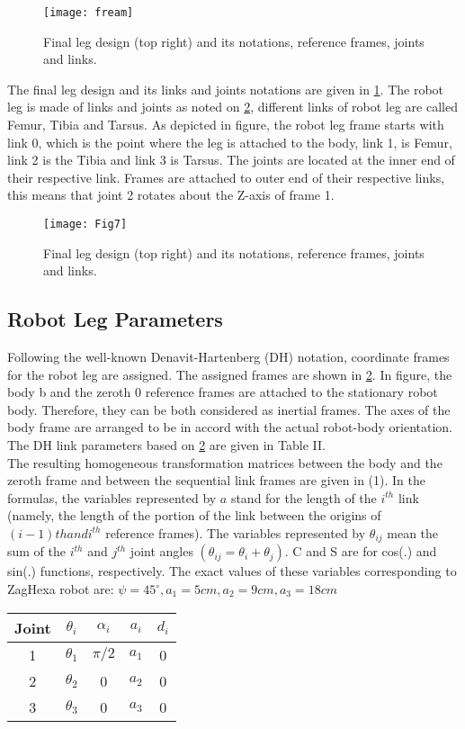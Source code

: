 \begin{figure}[h]
	\centering
	\texttt{[image: fream]}
	\caption{  Final leg design (top right) and its notations, reference frames, joints and links.}
	\label{fream}
\end{figure}

The final leg design and its links and joints notations are given in \ref{fream}. The robot leg is made of links and joints as noted on \ref{leg}, different links of robot leg are called Femur, Tibia and Tarsus. As depicted in figure, the robot leg frame starts with link 0, which is the point where the leg is attached to the body, link 1, is Femur, link 2 is the Tibia and link 3 is Tarsus. The joints are located at the inner end of their respective link. Frames are attached to outer end of their respective links, this means that joint 2 rotates about the Z-axis of frame 1.

\begin{figure}[h]
	\centering
	\texttt{[image: Fig7]}
	\caption{  Final leg design (top right) and its notations, reference frames, joints and links.}
	\label{leg}
\end{figure}

\subsection{Robot Leg Parameters}
Following the well-known Denavit-Hartenberg (DH) notation, coordinate frames for the robot leg are assigned. The assigned frames are shown in \ref{leg}. In figure, the body {b} and the zeroth {0} reference frames are attached to the stationary robot body. Therefore, they can be both considered as inertial frames. The axes of the body frame are arranged to be in accord with the actual robot-body orientation. The DH link parameters based on \ref{leg} are given in Table II.\\

The resulting homogeneous transformation matrices between the body and the zeroth frame and between the sequential link frames are given in (1).  In the formulas, the variables represented by $a$ stand for the length of the $i^{th}$ link (namely, the length of the portion of the link between the origins of $(i-1) th and i^{th}$ reference frames). The variables represented by $\theta_{ij}$ mean the sum of the $i^{th}$ and $j^{th}$ joint angles $(\theta_{ij}=\theta_i+\theta_j)$. C and S are for cos(.) and sin(.) functions, respectively.  The exact values of these variables corresponding to ZagHexa robot are: 
$\psi = 45^\circ, a_1= 5cm, a_2= 9cm, a_3= 18cm$
\begin{center}
\begin{tabular}{|c||c|c|c|c|}
	\hline
	Joint & $\theta_i$ & $\alpha_i$ & $a_i$ & $d_i$ \\ \hline
	1&		$\theta_1$ & $\pi/2$	& $a_1$ & 0 \\ \hline
	2&		$\theta_2$ & 0			& $a_2$ & 0 \\ \hline
	3&		$\theta_3$ & 0			& $a_3$ & 0 \\ \hline
\end{tabular}
\end{center}

